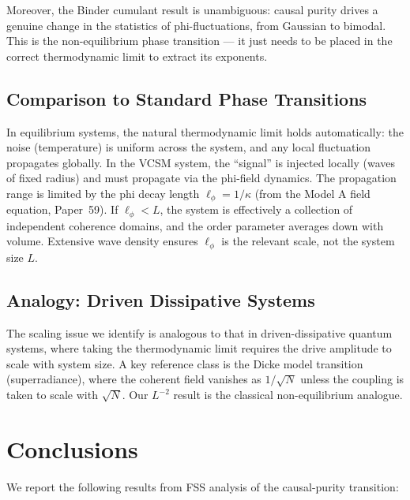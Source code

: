 \documentclass[12pt,a4paper]{article}
\begin{document}
Moreover, the Binder cumulant result is unambiguous: causal purity drives
a genuine change in the statistics of phi-fluctuations, from Gaussian to bimodal.
This is the non-equilibrium phase transition --- it just needs to be placed
in the correct thermodynamic limit to extract its exponents.

\subsection{Comparison to Standard Phase Transitions}

In equilibrium systems, the natural thermodynamic limit holds automatically:
the noise (temperature) is uniform across the system, and any local fluctuation
propagates globally.
In the VCSM system, the ``signal'' is injected locally (waves of fixed radius)
and must propagate via the phi-field dynamics.
The propagation range is limited by the phi decay length
$\ell_\phi = 1/\kappa$ (from the Model A field equation, Paper~59).
If $\ell_\phi < L$, the system is effectively a collection of independent
coherence domains, and the order parameter averages down with volume.
Extensive wave density ensures $\ell_\phi$ is the relevant scale,
not the system size $L$.

\subsection{Analogy: Driven Dissipative Systems}

The scaling issue we identify is analogous to that in driven-dissipative
quantum systems, where taking the thermodynamic limit requires the
drive amplitude to scale with system size.
A key reference class is the Dicke model transition (superradiance),
where the coherent field vanishes as $1/\sqrt{N}$ unless the coupling
is taken to scale with $\sqrt{N}$.
Our $L^{-2}$ result is the classical non-equilibrium analogue.

\section{Conclusions}
\label{sec:conclusions}

We report the following results from FSS analysis of the causal-purity transition:
\end{document}
